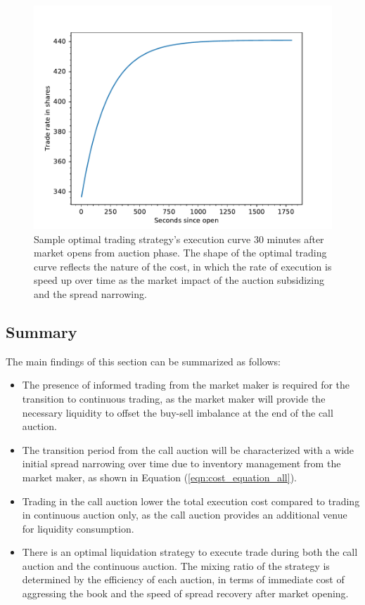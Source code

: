 

\begin{figure}[h]
  \includegraphics[width=\textwidth]{images/SampleTradeCurve}
  \caption{Sample optimal trading strategy's execution curve 30 minutes after market opens from auction phase. The shape of the optimal trading curve reflects the nature of the cost, in which the rate of execution is speed up over time as the market impact of the auction subsidizing and the spread narrowing.}
  \label{fig:optimal_curve_strategy}
\end{figure}

\subsection{Summary}

The main findings of this section can be summarized as follows:

\begin{itemize}
  \item The presence of informed trading from the market maker is required for the transition to continuous trading, as the market maker will provide the necessary liquidity to offset the buy-sell imbalance at the end of the call auction.
  \item The transition period from the call auction will be characterized with a wide initial spread narrowing over time due to inventory management from the market maker, as shown in Equation (\ref{eqn:cost_equation_all}).
  \item Trading in the call auction lower the total execution cost compared to trading in continuous auction only, as the call auction provides an additional venue for liquidity consumption.
  \item There is an optimal liquidation strategy to execute trade during both the call auction and the continuous auction. The mixing ratio of the strategy is determined by the efficiency of each auction, in terms of immediate cost of aggressing the book and the speed of spread recovery after market opening.
\end{itemize}


